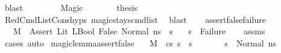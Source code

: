 \begin{isabellebody}
\ blast\isanewline
\ \ \isamarkupfalse%
\isanewline
\ \ \ \ \isamarkupfalse%
\ Magic\isanewline
\ \ \ \ \isamarkupfalse%
\ \isamarkupfalse%
\ {\isacharquery}{\kern0pt}thesis\isanewline
\ \ \ \ \ \ \isamarkupfalse%
\ RedCmdListCons{\isachardot}{\kern0pt}hyps{\isacharparenleft}{\kern0pt}{}{\isacharparenright}{\kern0pt}\ magic{\isacharunderscore}{\kern0pt}stays{\isacharunderscore}{\kern0pt}cmd{\isacharunderscore}{\kern0pt}list{\isacharunderscore}{\kern0pt}{}\ \isamarkupfalse%
\ blast\isanewline
\ \ \isamarkupfalse%
\isanewline
{}\isamarkupfalse%
\isanewline
{}\isamarkupfalse%
%
\endisatagproof
{\isafoldproof}%
%
\isadelimproof
\isanewline
%
\endisadelimproof
\isanewline
{}\isamarkupfalse%
\ assert{\isacharunderscore}{\kern0pt}false{\isacharunderscore}{\kern0pt}failure{\isacharcolon}{\kern0pt}\isanewline
\ \ \ {\isachardoublequoteopen}M{\isacharcomma}{\kern0pt}{\isasymLambda}{\isacharcomma}{\kern0pt}{\isasymGamma}{\isacharcomma}{\kern0pt}{\isasymOmega}\ {\isasymturnstile}\ {\isasymlangle}Assert\ {\isacharparenleft}{\kern0pt}Lit\ {\isacharparenleft}{\kern0pt}LBool\ False{\isacharparenright}{\kern0pt}{\isacharparenright}{\kern0pt}{\isacharcomma}{\kern0pt}\ Normal\ ns{\isasymrangle}\ {\isasymrightarrow}\ s{\isachardoublequoteclose}\isanewline
\ \ \ {\isachardoublequoteopen}s\ {\isacharequal}{\kern0pt}\ Failure{\isachardoublequoteclose}\isanewline
%
\isadelimproof
\ \ %
\endisadelimproof
%
\isatagproof
{}\isamarkupfalse%
\ assms\isanewline
\ \ \isamarkupfalse%
\ {\isacharparenleft}{\kern0pt}cases{\isacharparenright}{\kern0pt}\ auto%
\endisatagproof
{\isafoldproof}%
%
\isadelimproof
\isanewline
%
\endisadelimproof
\isanewline
{}\isamarkupfalse%
\ magic{\isacharunderscore}{\kern0pt}lemma{\isacharunderscore}{\kern0pt}assert{\isacharunderscore}{\kern0pt}false{\isacharcolon}{\kern0pt}\isanewline
\ \ \ {\isachardoublequoteopen}M{\isacharcomma}{\kern0pt}{\isasymLambda}{\isacharcomma}{\kern0pt}{\isasymGamma}{\isacharcomma}{\kern0pt}{\isasymOmega}\ {\isasymturnstile}\ {\isasymlangle}cs{\isacharcomma}{\kern0pt}\ s{\isasymrangle}\ {\isacharbrackleft}{\kern0pt}{\isasymrightarrow}{\isacharbrackright}{\kern0pt}\ s{\isacharprime}{\kern0pt}{\isachardoublequoteclose}\isanewline
\ \ \ \ \ \ \ {\isachardoublequoteopen}s\ {\isacharequal}{\kern0pt}\ Normal\ ns{\isachardoublequoteclose}\isanewline

\end{isabellebody}
